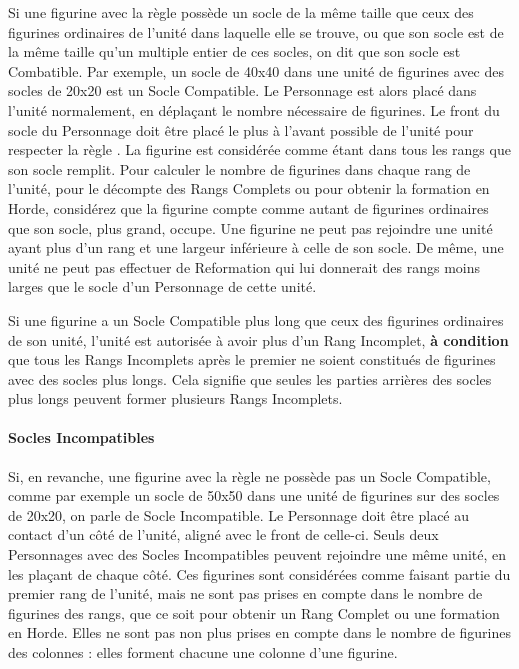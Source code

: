Si une figurine avec la règle \frontrank{} possède un socle de la même taille que ceux des figurines ordinaires de l'unité dans laquelle elle se trouve, ou que son socle est de la même taille qu'un multiple entier de ces socles, on dit que son socle est Combatible. Par exemple, un socle de \unit{40x40}{\milli\meter} dans une unité de figurines avec des socles de \unit{20x20}{\milli\meter} est un Socle Compatible. Le Personnage est alors placé dans l'unité normalement, en déplaçant le nombre nécessaire de figurines. Le front du socle du Personnage doit être placé le plus à l'avant possible de l'unité pour respecter la règle \frontrank{}. La figurine est considérée comme étant dans tous les rangs que son socle remplit. Pour calculer le nombre de figurines dans chaque rang de l'unité, pour le décompte des Rangs Complets ou pour obtenir la formation en Horde, considérez que la figurine compte comme autant de figurines ordinaires que son socle, plus grand, occupe. Une figurine ne peut pas rejoindre une unité ayant plus d'un rang et une largeur inférieure à celle de son socle. De même, une unité ne peut pas effectuer de Reformation qui lui donnerait des rangs moins larges que le socle d'un Personnage de cette unité.

Si une figurine a un Socle Compatible plus long que ceux des figurines ordinaires de son unité, l'unité est autorisée à avoir plus d'un Rang Incomplet, \textbf{à condition} que tous les Rangs Incomplets après le premier ne soient constitués de figurines avec des socles plus longs. Cela signifie que seules les parties arrières des socles plus longs peuvent former plusieurs Rangs Incomplets.

\paragraph{Socles Incompatibles}

Si, en revanche, une figurine avec la règle \frontrank{} ne possède pas un Socle Compatible, comme par exemple un socle de \unit{50x50}{\milli\meter} dans une unité de figurines sur des socles de \unit{20x20}{\milli\meter}, on parle de Socle Incompatible. Le Personnage doit être placé au contact d'un côté de l'unité, aligné avec le front de celle-ci. Seuls deux Personnages avec des Socles Incompatibles peuvent rejoindre une même unité, en les plaçant de chaque côté. Ces figurines sont considérées comme faisant partie du premier rang de l'unité, mais ne sont pas prises en compte dans le nombre de figurines des rangs, que ce soit pour obtenir un Rang Complet ou une formation en Horde. Elles ne sont pas non plus prises en compte dans le nombre de figurines des colonnes : elles forment chacune une colonne d'une figurine.


